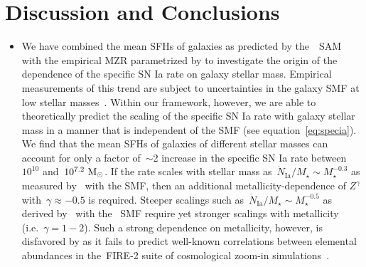 \documentclass[ms.tex]{subfiles}
\begin{document}
\section{Discussion and Conclusions}
\label{sec:conclusions}

\begin{itemize}

	\item We have combined the mean SFHs of galaxies as predicted by
	the~\um~SAM~\citep{Behroozi2019} with the empirical MZR parametrized by
	\citet{Zahid2014} to investigate the origin of the dependence of the
	specific SN Ia rate on galaxy stellar mass.
	Empirical measurements of this trend are subject to uncertainties in the
	galaxy SMF at low stellar masses~\citep{Gandhi2022}.
	Within our framework, however, we are able to theoretically predict the
	scaling of the specific SN Ia rate with galaxy stellar mass in a manner
	that is independent of the SMF (see equation~\ref{eq:specia}).
	We find that the mean SFHs of galaxies of different stellar masses can
	account for only a factor of~$\sim$2 increase in the specific SN Ia rate
	between~$10^{10}$ and~$10^{7.2}~\text{M}_\odot$.
	If the rate scales with stellar mass as~$\dot{N}_\text{Ia} / M_\star
	\sim M_\star^{-0.3}$ as measured by~\citet{Gandhi2022} with the
	\citet{Baldry2012} SMF, then an additional metallicity-dependence of
	$Z^\gamma$ with~$\gamma \approx -0.5$ is required.
	Steeper scalings such as~$\dot{N}_\text{Ia} / M_\star \sim M_\star^{-0.5}$
	as derived by~\citet{Brown2019} with the~\citet{Bell2003} SMF require yet
	stronger scalings with metallicity (i.e.~$\gamma = 1 - 2$).
	Such a strong dependence on metallicity, however, is disfavored by
	\citet{Gandhi2022} as it fails to predict well-known correlations between
	elemental abundances in the~\textsc{FIRE-2} suite of cosmological zoom-in
	simulations~\citep{Hopkins2018}.


\end{itemize}
\end{document}
